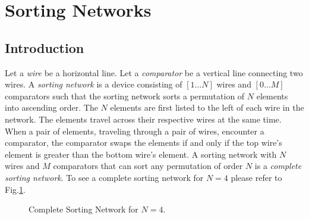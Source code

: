 
\section{Sorting Networks}
\subsection{Introduction}
Let a \emph{wire} be a horizontal line. Let a \emph{comparator} be a vertical line connecting two wires. A 
\emph{sorting network} is a device consisting of $[1 \dots N]$ wires and $[0 \dots M]$  
comparators such that the sorting network sorts a permutation of $N$ elements into ascending order. The 
$N$ elements are first listed to the left of each wire in the network. The elements travel across their respective wires 
at the same time. When a pair of elements, traveling through a pair of wires, 
encounter a comparator, the comparator swaps the elements if and only if the top wire's element 
is greater than the bottom wire's element. A sorting network with $N$ wires and $M$ 
comparators that can sort any permutation of order $N$ is a \emph{complete sorting network}. 
To see a complete sorting network for $N=4$ please refer to Fig.\ref{Fig:SortNetwork}. \par 

\begin{figure}
    \centering
    \caption{Complete Sorting Network for $N=4$.}
    \label{Fig:SortNetwork}
\end{figure}

